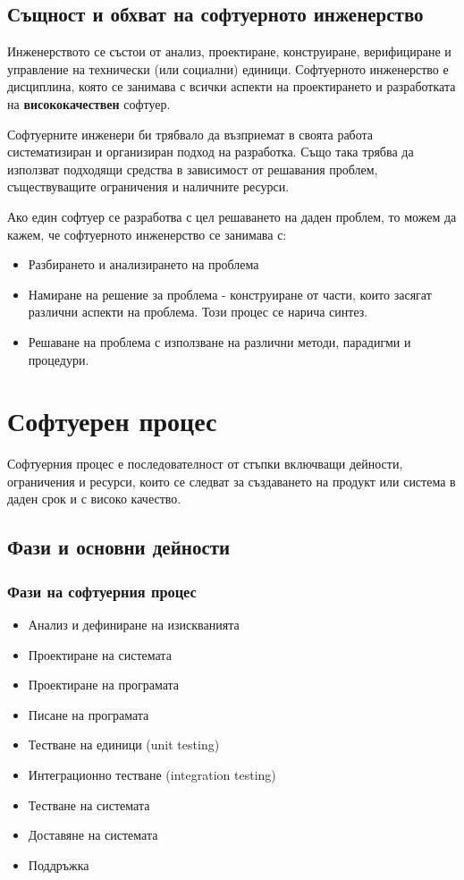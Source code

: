 \documentclass[fleqn,12pt]{article}
\begin{document}
\subsection{Същност и обхват на софтуерното инженерство}
Инженерството се състои от анализ, проектиране, конструиране, верифициране и управление на технически (или социални) единици. Софтуерното инженерство е дисциплина, която се занимава с всички аспекти на проектирането и разработката на \textbf{висококачествен} софтуер.

Софтуерните инженери би трябвало да възприемат в своята работа систематизиран и организиран подход на разработка. Също така трябва да използват подходящи средства в зависимост от решавания проблем, съществуващите ограничения и наличните ресурси.

Ако един софтуер се разработва с цел решаването на даден проблем, то можем да кажем, че софтуерното инженерство се занимава с:
\begin{itemize}
	\item Разбирането и анализирането на проблема
	\item Намиране на решение за проблема - конструиране от части, които засягат различни аспекти на проблема. Този процес се нарича синтез.
	\item Решаване на проблема с използване на различни методи, парадигми и процедури.
\end{itemize}

\section{Софтуерен  процес}

Софтуерния процес е последователност от стъпки включващи дейности, ограничения и ресурси, които се следват за създаването на продукт или система в даден срок и с високо качество.

\subsection{Фази и  основни  дейности}
\subsubsection{Фази на софтуерния процес}
\begin{itemize}
	\item Анализ и дефиниране на изискванията
	\item Проектиране на системата
	\item Проектиране на програмата
	\item Писане на програмата
	\item Тестване на единици (unit testing)
	\item Интеграционно тестване (integration testing)
	\item Тестване на системата
	\item Доставяне на системата
	\item Поддръжка
\end{itemize}
\end{document}
